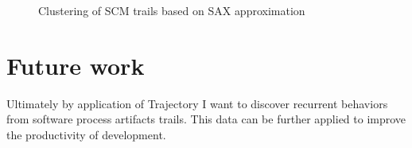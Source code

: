 \documentclass[a4paper,10pt]{article}
\numberwithin{equation}{subsection}
\begin{document}
\begin{figure}[ht]
\centering
{}
\label{fig:clustering}
\caption[Clustering experiment]{Clustering of SCM trails based on SAX approximation}
\end{figure}

\section{Future work}
Ultimately by application of Trajectory I want to discover recurrent behaviors from
software process artifacts trails. This data can be further applied to improve the
productivity of development.
\end{document}
